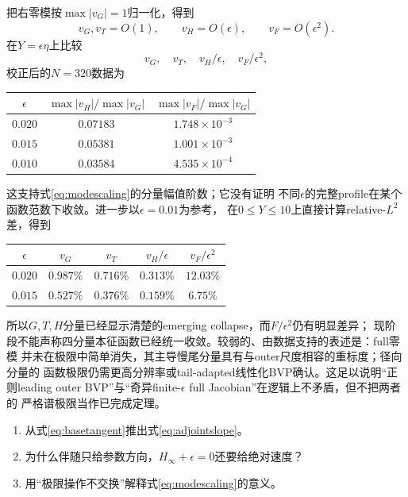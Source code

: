 \documentclass[UTF8,zihao=-4,openany]{ctexbook}
\newcommand{\eps}{\epsilon}
\begin{document}
把右零模按$\max|v_G|=1$归一化，得到
\begin{equation}\label{eq:modescaling}
 v_G,v_T=O(1),\qquad v_H=O(\eps),\qquad v_F=O(\eps^2).
\end{equation}
在$Y=\eps\eta$上比较
\begin{equation}
 v_G,\quad v_T,\quad v_H/\eps,\quad v_F/\eps^2,
\end{equation}
校正后的$N=320$数据为
\begin{center}
\begin{tabular}{ccc}
\toprule
$\eps$ & $\max|v_H|/\max|v_G|$ & $\max|v_F|/\max|v_G|$\\
\midrule
$0.020$ & $0.07183$ & $1.748\times10^{-3}$\\
$0.015$ & $0.05381$ & $1.001\times10^{-3}$\\
$0.010$ & $0.03584$ & $4.535\times10^{-4}$\\
\bottomrule
\end{tabular}
\end{center}
这支持式\eqref{eq:modescaling}的分量幅值阶数；它没有证明
不同$\eps$的完整profile在某个函数范数下收敛。进一步以$\eps=0.01$为参考，
在$0\le Y\le10$上直接计算relative-$L^2$差，得到
\begin{center}
\begin{tabular}{ccccc}
\toprule
$\eps$ & $v_G$ & $v_T$ & $v_H/\eps$ & $v_F/\eps^2$\\
\midrule
$0.020$ & $0.987\%$ & $0.716\%$ & $0.313\%$ & $12.03\%$\\
$0.015$ & $0.527\%$ & $0.376\%$ & $0.159\%$ & $6.75\%$\\
\bottomrule
\end{tabular}
\end{center}
所以$G,T,H$分量已经显示清楚的emerging collapse，而$F/\eps^2$仍有明显差异；
现阶段不能声称四分量本征函数已经统一收敛。较弱的、由数据支持的表述是：full零模
并未在极限中简单消失，其主导慢尾分量具有与outer尺度相容的重标度；径向分量的
函数极限仍需更高分辨率或tail-adapted线性化BVP确认。这足以说明“正则leading
outer BVP”与“奇异finite-$\eps$ full Jacobian”在逻辑上不矛盾，但不把两者的
严格谱极限当作已完成定理。

\enlargethispage{4\baselineskip}
\begin{checkpoint}
\begin{enumerate}
  \item 从式\eqref{eq:basetangent}推出式\eqref{eq:adjointslope}。
  \item 为什么伴随只给参数方向，$H_\infty+\eps=0$还要给绝对速度？
  \item 用“极限操作不交换”解释式\eqref{eq:modescaling}的意义。
\end{enumerate}
\end{checkpoint}
\end{document}
